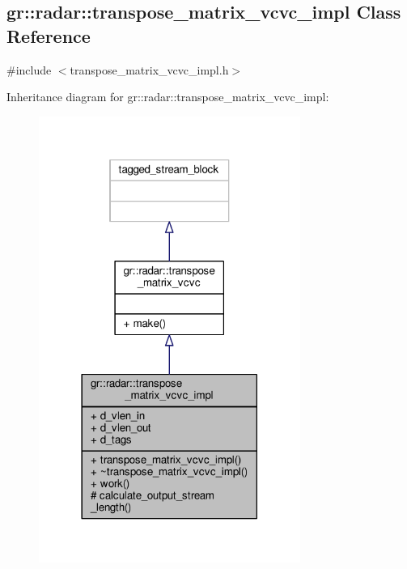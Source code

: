\subsection{gr\+:\+:radar\+:\+:transpose\+\_\+matrix\+\_\+vcvc\+\_\+impl Class Reference}
\label{classgr_1_1radar_1_1transpose__matrix__vcvc__impl}


{\ttfamily \#include $<$transpose\+\_\+matrix\+\_\+vcvc\+\_\+impl.\+h$>$}



Inheritance diagram for gr\+:\+:radar\+:\+:transpose\+\_\+matrix\+\_\+vcvc\+\_\+impl\+:
\nopagebreak
\begin{figure}[H]
\begin{center}
\leavevmode
\includegraphics[width=242pt]{dd/d44/classgr_1_1radar_1_1transpose__matrix__vcvc__impl__inherit__graph}
\end{center}
\end{figure}


